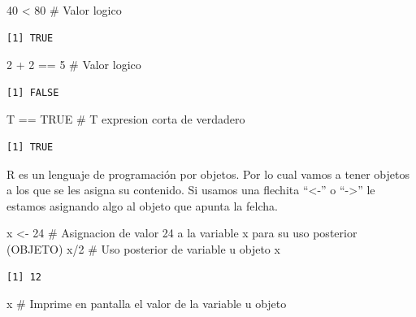 \documentclass[
  letterpaper,
  DIV=11,
  numbers=noendperiod]{scrreprt}
\newenvironment{Shaded}{\begin{snugshade}}{\end{snugshade}}
\newcommand{\CommentTok}[1]{\textcolor[rgb]{0.37,0.37,0.37}{#1}}
\newcommand{\ConstantTok}[1]{\textcolor[rgb]{0.56,0.35,0.01}{#1}}
\newcommand{\DecValTok}[1]{\textcolor[rgb]{0.68,0.00,0.00}{#1}}
\newcommand{\NormalTok}[1]{\textcolor[rgb]{0.00,0.23,0.31}{#1}}
\newcommand{\OtherTok}[1]{\textcolor[rgb]{0.00,0.23,0.31}{#1}}
\newcommand{\SpecialCharTok}[1]{\textcolor[rgb]{0.37,0.37,0.37}{#1}}
\begin{document}
\begin{Shaded}
\begin{Highlighting}[]
\DecValTok{40} \SpecialCharTok{\textless{}} \DecValTok{80}         \CommentTok{\# Valor logico}
\end{Highlighting}
\end{Shaded}

\begin{verbatim}
[1] TRUE
\end{verbatim}

\begin{Shaded}
\begin{Highlighting}[]
\DecValTok{2} \SpecialCharTok{+} \DecValTok{2} \SpecialCharTok{==} \DecValTok{5}      \CommentTok{\# Valor logico}
\end{Highlighting}
\end{Shaded}

\begin{verbatim}
[1] FALSE
\end{verbatim}

\begin{Shaded}
\begin{Highlighting}[]
\NormalTok{T }\SpecialCharTok{==} \ConstantTok{TRUE}       \CommentTok{\# T expresion corta de verdadero}
\end{Highlighting}
\end{Shaded}

\begin{verbatim}
[1] TRUE
\end{verbatim}

R es un lenguaje de programación por objetos. Por lo cual vamos a tener
objetos a los que se les asigna su contenido. Si usamos una flechita
``\textless-'' o ``-\textgreater{}'' le estamos asignando algo al objeto
que apunta la felcha.

\begin{Shaded}
\begin{Highlighting}[]
\NormalTok{x }\OtherTok{\textless{}{-}} \DecValTok{24}         \CommentTok{\# Asignacion de valor 24 a la variable x para su uso posterior (OBJETO)}
\NormalTok{x}\SpecialCharTok{/}\DecValTok{2}             \CommentTok{\# Uso posterior de variable u objeto x}
\end{Highlighting}
\end{Shaded}

\begin{verbatim}
[1] 12
\end{verbatim}

\begin{Shaded}
\begin{Highlighting}[]
\NormalTok{x               }\CommentTok{\# Imprime en pantalla el valor de la variable u objeto}
\end{Highlighting}
\end{Shaded}
\end{document}
